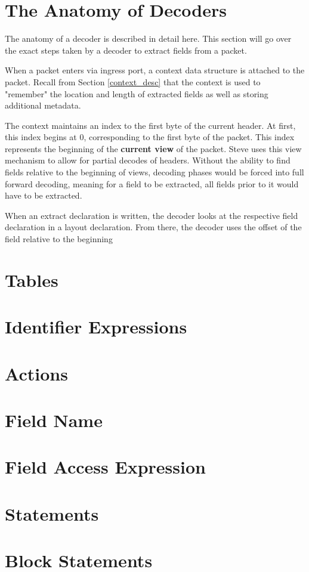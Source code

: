 \section{The Anatomy of Decoders} \label{decoder_guide}

The anatomy of a decoder is described in detail here. This section will go over the exact steps taken by a decoder to extract fields from a packet.

When a packet enters via ingress port, a context data structure is attached to the packet. Recall from Section \ref{context_desc} that the context is used to "remember" the location and length of extracted fields as well as storing additional metadata. 

The context maintains an index to the first byte of the current header. At first, this index begins at 0, corresponding to the first byte of the packet.
This index represents the beginning of the \textbf{current view} of the packet. Steve uses this view mechanism to allow for partial decodes of headers. Without the ability to find fields relative to the beginning of views, decoding phases would be forced into full forward decoding, meaning for a field to be extracted, all fields prior to it would have to be extracted.

 When an extract declaration is written, the decoder looks at the respective field declaration in a layout declaration. From there, the decoder uses the offset of the field relative to the beginning 

\section{Tables} \label{table_guide}

\section{Identifier Expressions} \label{id_expr}

\section{Actions} \label{action_guide}

\section{Field Name} \label{field_name}

\section{Field Access Expression} \label{field_access_expr}

\section{Statements} \label{statements_guide}

\section{Block Statements} \label{block_stmt_guide}